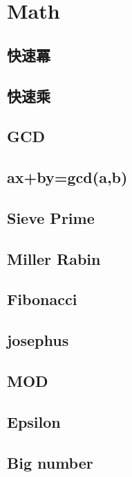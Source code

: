 \section{Math}

\subsection{快速冪}


\subsection{快速乘}


\subsection{GCD}


\subsection{ax+by=gcd(a,b)}


\subsection{Sieve Prime}


\subsection{Miller Rabin}


\subsection{Fibonacci}


\subsection{josephus}


\subsection{MOD}


\subsection{Epsilon}


\subsection{Big number}

